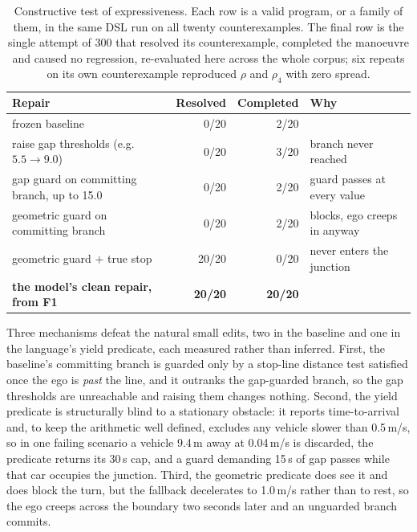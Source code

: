 \documentclass{article}
\newcommand{\rhoc}[1]{\rho_{#1}}
\begin{document}
\begin{table}[t]
\centering
\small
\caption{Constructive test of expressiveness. Each row is a valid program, or a
family of them, in the same DSL run on all twenty counterexamples. The final row is the single attempt
of 300 that resolved its counterexample, completed the manoeuvre and caused no
regression, re-evaluated here across the whole corpus; six repeats on its own
counterexample reproduced $\rho$ and $\rhoc{4}$ with zero spread.}
\label{tab:dsl}
\begin{tabular}{@{}lrrl@{}}
\toprule
\textbf{Repair} & \textbf{Resolved} & \textbf{Completed} & \textbf{Why} \\
\midrule
frozen baseline & 0/20 & 2/20 & \\
raise gap thresholds (e.g.\ $5.5 \rightarrow 9.0$) & 0/20 & 3/20 & branch never reached \\
gap guard on committing branch, up to 15.0 & 0/20 & 2/20 & guard passes at every value \\
geometric guard on committing branch & 0/20 & 2/20 & blocks, ego creeps in anyway \\
geometric guard $+$ true stop & 20/20 & 0/20 & never enters the junction \\
\midrule
\textbf{the model's clean repair, from F1} & \textbf{20/20} & \textbf{20/20} & \\
\bottomrule
\end{tabular}
\end{table}

Three mechanisms defeat the natural small edits, two in the baseline and one in
the language's yield predicate, each measured rather than inferred. First, the baseline's committing branch is guarded only by a
stop-line distance test satisfied once the ego is \emph{past} the line, and it
outranks the gap-guarded branch, so the gap thresholds are unreachable and
raising them changes nothing. Second, the yield predicate is structurally blind
to a stationary obstacle: it reports time-to-arrival and, to keep the arithmetic
well defined, excludes any vehicle slower than \mbox{0.5\,m/s}, so in one failing
scenario a vehicle \mbox{9.4\,m} away at \mbox{0.04\,m/s} is discarded, the
predicate returns its 30\,s cap, and a guard demanding 15\,s of gap passes while
that car occupies the junction. Third, the geometric predicate does see it and
does block the turn, but the fallback decelerates to \mbox{1.0\,m/s} rather than
to rest, so the ego creeps across the boundary two seconds later and an unguarded
branch commits.
\end{document}

